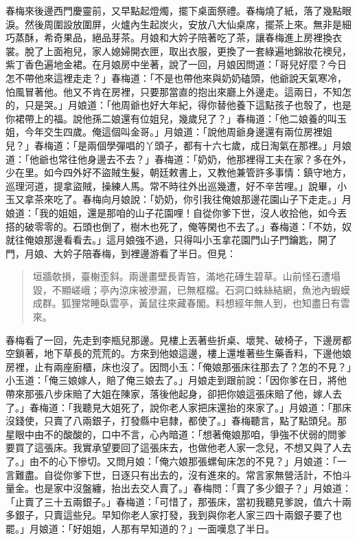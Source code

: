 春梅來後邊西門慶靈前，又早點起燈燭，擺下桌面祭禮。春梅燒了紙，落了幾點眼淚。然後周圍設放圍屏，火爐內生起炭火，安放八大仙桌席，擺茶上來。無非是細巧蒸酥，希奇果品，絕品芽茶。月娘和大妗子陪著吃了茶，讓春梅進上房裡換衣裳。脫了上面袍兒，家人媳婦開衣匣，取出衣服，更換了一套綠遍地錦妝花襖兒，紫丁香色遍地金裙。在月娘房中坐著，說了一回，月娘因問道：「哥兒好麼？今日怎不帶他來這裡走走？」春梅道：「不是也帶他來與奶奶磕頭，他爺說天氣寒冷，怕風冒著他。他又不肯在房裡，只要那當直的抱出來廳上外邊走。這兩日，不知怎的，只是哭。」月娘道：「他周爺也好大年紀，得你替他養下這點孩子也彀了，也是你裙帶上的福。說他孫二娘還有位姐兒，幾歲兒了？」春梅道：「他二娘養的叫玉姐，今年交生四歲。俺這個叫金哥。」月娘道：「說他周爺身邊還有兩位房裡姐兒？」春梅道：「是兩個學彈唱的丫頭子，都有十六七歲，成日淘氣在那裡。」月娘道：「他爺也常往他身邊去不去？」春梅道：「奶奶，他那裡得工夫在家？多在外，少在里。如今四外好不盜賊生髮，朝廷敕書上，又教他兼管許多事情：鎮守地方，巡理河道，提拿盜賊，操練人馬。常不時往外出巡幾遭，好不辛苦哩。」說畢，小玉又拿茶來吃了。春梅向月娘說：「奶奶，你引我往俺娘那邊花園山子下走走。」月娘道：「我的姐姐，還是那咱的山子花園哩！自從你爹下世，沒人收拾他，如今丟搭的破零零的。石頭也倒了，樹木也死了，俺等閑也不去了。」春梅道：「不妨，奴就往俺娘那邊看看去。」這月娘強不過，只得叫小玉拿花園門山子門鑰匙，開了門，月娘、大妗子陪春梅，到裡邊游看了半日。但見：
\begin{quote}
垣牆欹損，臺榭歪斜。兩邊畫壁長青笞，滿地花磚生碧草。山前怪石遭塌毀，不顯嵯峨；亭內涼床被滲漏，已無框檔。石洞口蛛絲結網，魚池內蝦蟆成群。狐狸常睡臥雲亭，黃鼠往來藏春閣。料想經年無人到，也知盡日有雲來。
\end{quote}

春梅看了一回，先走到李瓶兒那邊。見樓上丟著些折桌、壞凳、破椅子，下邊房都空鎖著，地下草長的荒荒的。方來到他娘這邊，樓上還堆著些生藥香料，下邊他娘房裡，止有兩座廚櫃，床也沒了。因問小玉：「俺娘那張床往那去了？怎的不見？」小玉道：「俺三娘嫁人，賠了俺三娘去了。」月娘走到跟前說：「因你爹在日，將他帶來那張八步床賠了大姐在陳家，落後他起身，卻把你娘這張床賠了他，嫁人去了。」春梅道：「我聽見大姐死了，說你老人家把床還抬的來家了。」月娘道：「那床沒錢使，只賣了八兩銀子，打發縣中皂隸，都使了。」春梅聽言，點了點頭兒。那星眼中由不的酸酸的，口中不言，心內暗道：「想著俺娘那咱，爭強不伏弱的問爹要買了這張床。我實承望要回了這張床去，也做他老人家一念兒，不想又與了人去了。」由不的心下慘切。又問月娘：「俺六娘那張螺甸床怎的不見？」月娘道：「一言難盡。自從你爹下世，日逐只有出去的，沒有進來的。常言家無營活計，不怕斗量金。也是家中沒盤纏，抬出去交人賣了。」春梅問：「賣了多少銀子？」月娘道：「止賣了三十五兩銀子。」春梅道：「可惜了，那張床，當初我聽見爹說，值六十兩多銀子，只賣這些兒。早知你老人家打發，我到與你老人家三四十兩銀子要了也罷。」月娘道：「好姐姐，人那有早知道的？」一面嘆息了半日。

